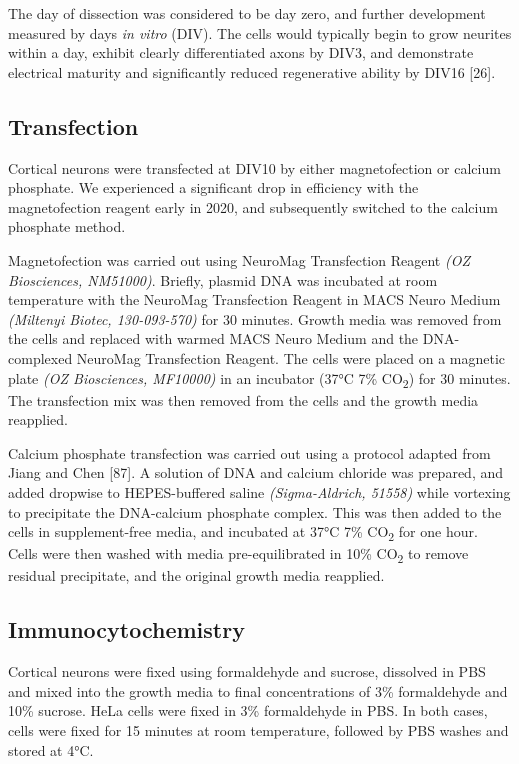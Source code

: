 \documentclass[
  12pt,
  a4paper,
]{book}
\begin{document}
The day of dissection was considered to be day zero, and further development measured by days \emph{in vitro} (DIV). The cells would typically begin to grow neurites within a day, exhibit clearly differentiated axons by DIV3, and demonstrate electrical maturity and significantly reduced regenerative ability by DIV16 {[}26{]}.

\subsection{Transfection}\label{transfection}

Cortical neurons were transfected at DIV10 by either magnetofection or calcium phosphate. We experienced a significant drop in efficiency with the magnetofection reagent early in 2020, and subsequently switched to the calcium phosphate method.

Magnetofection was carried out using NeuroMag Transfection Reagent \emph{(OZ Biosciences, NM51000)}. Briefly, plasmid DNA was incubated at room temperature with the NeuroMag Transfection Reagent in MACS Neuro Medium \emph{(Miltenyi Biotec, 130-093-570)} for 30 minutes. Growth media was removed from the cells and replaced with warmed MACS Neuro Medium and the DNA-complexed NeuroMag Transfection Reagent. The cells were placed on a magnetic plate \emph{(OZ Biosciences, MF10000)} in an incubator (37°C 7\% CO\textsubscript{2}) for 30 minutes. The transfection mix was then removed from the cells and the growth media reapplied.

Calcium phosphate transfection was carried out using a protocol adapted from Jiang and Chen {[}87{]}. A solution of DNA and calcium chloride was prepared, and added dropwise to HEPES-buffered saline \emph{(Sigma-Aldrich, 51558)} while vortexing to precipitate the DNA-calcium phosphate complex. This was then added to the cells in supplement-free media, and incubated at 37°C 7\% CO\textsubscript{2} for one hour. Cells were then washed with media pre-equilibrated in 10\% CO\textsubscript{2} to remove residual precipitate, and the original growth media reapplied.

\subsection{Immunocytochemistry}\label{immuno}

Cortical neurons were fixed using formaldehyde and sucrose, dissolved in PBS and mixed into the growth media to final concentrations of 3\% formaldehyde and 10\% sucrose. HeLa cells were fixed in 3\% formaldehyde in PBS. In both cases, cells were fixed for 15 minutes at room temperature, followed by PBS washes and stored at 4°C.
\end{document}
